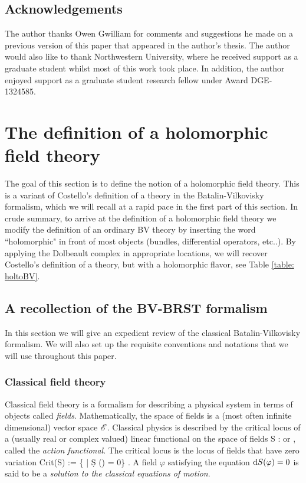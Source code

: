 \documentclass[10pt]{amsart}
\begin{document}
\subsection{Acknowledgements}

The author thanks Owen Gwilliam for comments and suggestions he made on a previous version of this paper that appeared in the author's thesis. 
The author would also like to thank Northwestern University, where he received support as a graduate student whilst most of this work took place. 
In addition, the author enjoyed support as a graduate student research fellow under Award DGE-1324585. 
 
\section{The definition of a holomorphic field theory}

The goal of this section is to define the notion of a holomorphic field theory. 
This is a variant of Costello's definition of a theory in the Batalin-Vilkovisky formalism, which we will recall at a rapid pace in the first part of this section.
In crude summary, to arrive at the definition of a holomorphic field theory we modify the definition of an ordinary BV theory by inserting the word ``holomorphic" in front of most objects (bundles, differential operators, etc..).
By applying the Dolbeault complex in appropriate locations, we will recover Costello's definition of a theory, but with a holomorphic flavor, see Table \ref{table: holtoBV}. 

\subsection{A recollection of the BV-BRST formalism}

In this section we will give an expedient review of the classical Batalin-Vilkovisky formalism.
We will also set up the requisite conventions and notations that we will use throughout this paper. 

\subsubsection{Classical field theory} \label{sec: classical bv}

Classical field theory is a formalism for describing a physical system in terms of objects called {\em fields}. 
Mathematically, the space of fields is a (most often infinite dimensional) vector space $\mathscr E$. 
Classical physics is described by the critical locus of a (usually real or complex valued) linear functional on the space of fields 
\be\label{actionfnl}
S : \sE \to \RR \;\; {\rm or} \;\; \CC,
\ee
called the {\em action functional}. 
The critical locus is the locus of fields that have zero variation
\be
{\rm Crit}(S) := \{\varphi \in \sE \; | \; \d S (\varphi) = 0\} .
\ee
A field $\varphi$ satisfying the equation ${\rm d} S (\varphi) = 0$ is said to be a {\em solution to the classical equations of motion}. 
\end{document}
